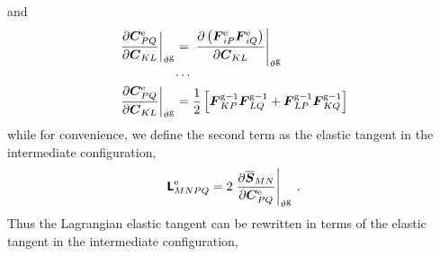 \documentclass[10pt,letterpaper,oneside]{report}
\newcommand{\ten}[1]{\mbox{\boldmath $#1$}{}}
\newcommand{\tenf}[1]{\mbox{{\sffamily{\bfseries {#1}}}}}
\newcommand{\scas}[1]{\mbox{{\scriptsize{${\rm{#1}}$}}}{}}
\begin{document}
and
\begin{align}
\left. \frac{ \partial \ten{C}^{\scas{e}}_{PQ} }{ \partial \ten{C}_{KL} } \right|_{\vartheta^{\scas{g}}} 
={}& \left. \frac{ \partial \left( \ten{F}^{\scas{e}}_{iP} \ten{F}^{\scas{e}}_{iQ} \right) }{ \partial \ten{C}_{KL} } \right|_{\vartheta^{\scas{g}}} 
\\
\cdots{}& \notag \\
\left. \frac{ \partial \ten{C}^{\scas{e}}_{PQ} }{ \partial \ten{C}_{KL} } \right|_{\vartheta^{\scas{g}}} 
={}& \frac{1}{2} \left[ \ten{F}^{\scas{g}-1}_{KP} \ten{F}^{\scas{g}-1}_{LQ} 
+ \ten{F}^{\scas{g}-1}_{LP} \ten{F}^{\scas{g}-1}_{KQ} \right] 
\end{align}
while for convenience, we define the second term as the elastic tangent in the intermediate configuration,
\begin{equation}
\tenf{L}^{\scas{e}}_{MNPQ} = 2 \left. \frac{\partial \overline{\ten{S}}_{MN} }{\partial \ten{C}^{\scas{e}}_{PQ} } \right|_{\vartheta^{\scas{g}}} \, .
\end{equation}
Thus the Lagrangian elastic tangent can be rewritten in terms of the elastic tangent in the intermediate configuration,   
\end{document}

